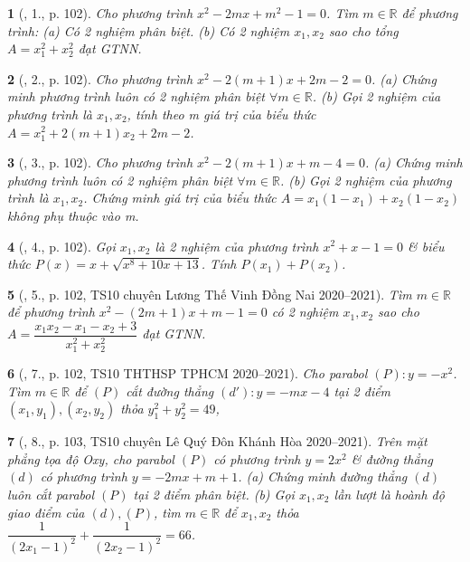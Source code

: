 \documentclass{article}
\newtheorem{baitoan}{}
\begin{document}
\begin{baitoan}[\cite{Thu_Viet_Minh_ptb2}, 1., p. 102]
	Cho phương trình $x^2 - 2mx + m^2 - 1 = 0$. Tìm $m\in\mathbb{R}$ để phương trình: (a) Có 2 nghiệm phân biệt. (b) Có 2 nghiệm $x_1,x_2$ sao cho tổng $A = x_1^2 + x_2^2$ đạt {\rm GTNN}. 
\end{baitoan}

\begin{baitoan}[\cite{Thu_Viet_Minh_ptb2}, 2., p. 102]
	Cho phương trình $x^2 - 2(m + 1)x + 2m - 2 = 0$. (a) Chứng minh phương trình luôn có 2 nghiệm phân biệt $\forall m\in\mathbb{R}$. (b) Gọi 2 nghiệm của phương trình là $x_1,x_2$, tính theo m giá trị của biểu thức $A = x_1^2 + 2(m + 1)x_2 + 2m - 2$.
\end{baitoan}

\begin{baitoan}[\cite{Thu_Viet_Minh_ptb2}, 3., p. 102]
	Cho phương trình $x^2 - 2(m + 1)x + m - 4 = 0$. (a) Chứng minh phương trình luôn có 2 nghiệm phân biệt $\forall m\in\mathbb{R}$. (b) Gọi 2 nghiệm của phương trình là $x_1,x_2$. Chứng minh giá trị của biểu thức $A= x_1(1 - x_1) + x_2(1 - x_2)$ không phụ thuộc vào m.
\end{baitoan}

\begin{baitoan}[\cite{Thu_Viet_Minh_ptb2}, 4., p. 102]
	Gọi $x_1,x_2$ là 2 nghiệm của phương trình $x^2 + x - 1 = 0$ \& biểu thức $P(x) = x +  \sqrt{x^8 + 10x + 13}$. Tính $P(x_1) + P(x_2)$.
\end{baitoan}

\begin{baitoan}[\cite{Thu_Viet_Minh_ptb2}, 5., p. 102, TS10 chuyên Lương Thế Vinh Đồng Nai 2020--2021]
	Tìm $m\in\mathbb{R}$ để phương trình $x^2 - (2m + 1)x + m - 1 = 0$ có 2 nghiệm $x_1,x_2$ sao cho $A = \dfrac{x_1x_2 - x_1 - x_2 + 3}{x_1^2 + x_2^2}$ đạt {\rm GTNN}.
\end{baitoan}

\begin{baitoan}[\cite{Thu_Viet_Minh_ptb2}, 7., p. 102, TS10 THTHSP TPHCM 2020--2021]
	Cho parabol $(P):y = -x^2$. Tìm $m\in\mathbb{R}$ để $(P)$ cắt đường thẳng $(d'):y = -mx - 4$ tại 2 điểm $(x_1,y_1),(x_2,y_2)$ thỏa $y_1^2 + y_2^2 = 49$,
\end{baitoan}

\begin{baitoan}[\cite{Thu_Viet_Minh_ptb2}, 8., p. 103, TS10 chuyên Lê Quý Đôn Khánh Hòa 2020--2021]
	Trên mặt phẳng tọa độ Oxy, cho parabol $(P)$ có phương trình $y = 2x^2$ \& đường thẳng $(d)$ có phương trình $y = -2mx + m + 1$. (a) Chứng minh đường thẳng $(d)$ luôn cắt parabol $(P)$ tại 2 điểm phân biệt. (b) Gọi $x_1,x_2$ lần lượt là hoành độ giao điểm của $(d),(P)$, tìm $m\in\mathbb{R}$ để $x_1,x_2$ thỏa $\dfrac{1}{(2x_1 - 1)^2} + \dfrac{1}{(2x_2 - 1)^2} = 66$.
\end{baitoan}
\end{document}
